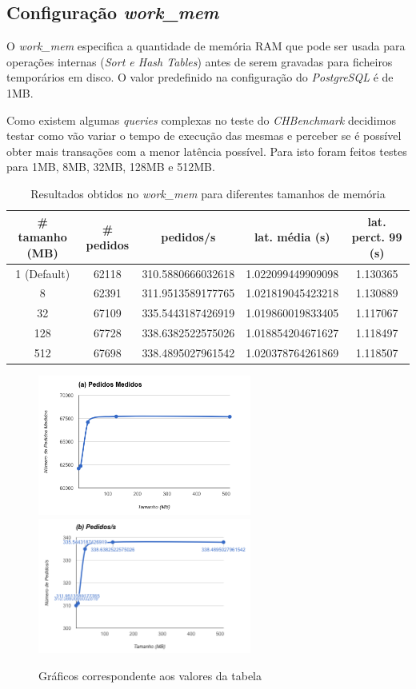 \subsection{Configuração \textit{work\_mem}}

O \textit{work\_mem} especifica a quantidade de memória RAM que pode ser usada para operações internas (\textit{Sort e Hash Tables}) antes de serem gravadas para ficheiros temporários em disco. O valor predefinido na configuração do \textit{PostgreSQL} é de 1MB.

Como existem algumas \textit{queries} complexas no teste do \textit{CHBenchmark} decidimos testar como vão variar o tempo de execução das mesmas e perceber se é possível obter mais transações com a menor latência possível. Para isto foram feitos testes para 1MB, 8MB, 32MB, 128MB e 512MB.

\begin{table}[!h]
\center
\small
\begin{tabular}{|c|c|c|c|c|}
\hline
\textbf{\# tamanho (MB)} & \textbf{\# pedidos} & \textbf{pedidos/s} & \textbf{lat. média (s)} & \textbf{lat. perct. 99 (s)}  \\ \hline
1 (Default) & 62118 & 310.5880666032618 & 1.022099449909098 & 1.130365  \\ \hline
8 & 62391 & 311.9513589177765 & 1.021819045423218 & 1.130889  \\ \hline
32 & 67109 & 335.5443187426919 & 1.019860019833405 & 1.117067  \\ \hline
128 & 67728 & 338.6382522575026 & 1.018854204671627 & 1.118497  \\ \hline
512 & 67698 & 338.4895027961542 & 1.020378764261869 & 1.118507  \\ \hline
\end{tabular}
\caption{Resultados obtidos no \textit{work\_mem} para diferentes tamanhos de memória}
\end{table}

\begin{figure}[ht!]
\centering
\includegraphics[width=70mm]{img/06_wm_a.png}
\includegraphics[width=70mm]{img/06_wm_b.png}
\caption{Gráficos correspondente aos valores da tabela \label{overflow}}
\end{figure}

